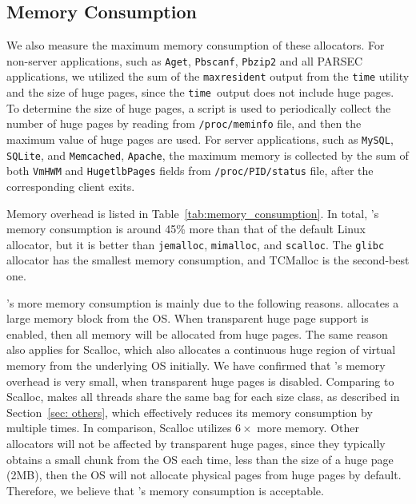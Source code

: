 \subsection{Memory Consumption}
\label{sec:memory}

We also measure the maximum memory consumption of these allocators. For non-server applications, such as \texttt{Aget}, \texttt{Pbscanf}, \texttt{Pbzip2} and all PARSEC applications, we utilized the sum of the \texttt{maxresident} output from the \texttt{time} utility and the size of huge pages, since the \texttt{time }output does not include huge pages. 
To determine the size of huge pages, a script is used to periodically collect the number of huge pages by reading from \texttt{/proc/meminfo} file, and then the maximum value of huge pages are used. 
For server applications, such as \texttt{MySQL}, \texttt{SQLite}, and \texttt{Memcached}, \texttt{Apache}, the maximum memory is collected by the sum of both \texttt{VmHWM} and \texttt{HugetlbPages} fields from \texttt{/proc/PID/status} file, after the corresponding client exits. 


% 

Memory overhead is listed in Table~\ref{tab:memory_consumption}. In total, \NM{}'s memory consumption is around 45\% more than that of the default Linux allocator, but it is better than \texttt{jemalloc}, \texttt{mimalloc}, and \texttt{scalloc}.  The \texttt{glibc} allocator has the smallest memory consumption, and TCMalloc is the second-best one. 
 
\NM{}'s more memory consumption is mainly due to the following reasons. \NM{} allocates a large memory block from the OS. When transparent huge page support is enabled, then all memory will be allocated from huge pages. The same reason also applies for Scalloc, which also allocates a continuous huge region of virtual memory from the underlying OS initially. We have confirmed that \NM{}'s memory overhead is very small, when transparent huge pages is disabled. Comparing to Scalloc, \NM{} makes all threads share the same bag for each size class, as described in Section~\ref{sec: others}, which effectively reduces its memory consumption by multiple times. In comparison, Scalloc utilizes $6\times$ more memory. Other allocators will not be affected by transparent huge pages, since they typically obtains a small chunk from the OS each time, less than the size of a huge page (2MB), then the OS will not allocate physical pages from huge pages by default.  
Therefore, we believe that \NM{}'s memory consumption is acceptable. 

